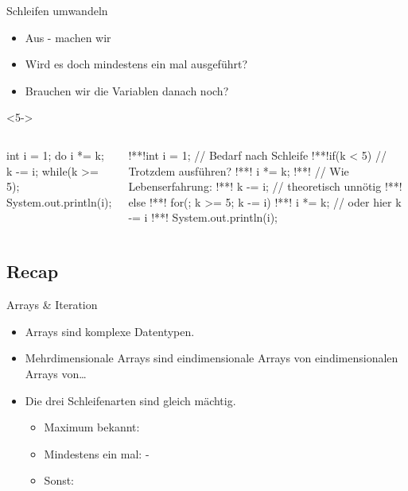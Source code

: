 \begin{frame}[fragile,c]{Schleifen umwandeln}
\begin{itemize}[<+(1)->]
   \itemsep3pt
   \item Aus - machen wir 
   \item Wird es doch mindestens ein mal ausgeführt?
   \item Brauchen wir die Variablen danach noch?
\end{itemize}
\begin{uncoverenv}<5->
\begin{columns}[onlytextwidth,c]
\begin{plainjava}
int i = 1;
do {
  i *= k;
  k -= i;
} while(k >= 5);
System.out.println(i);
\end{plainjava}
\vspace*{-1.15\baselineskip}\par\null\qquad{\color{lightgray}\faCaretRight}
\begin{plainjava}
!**!int i = 1; // Bedarf nach Schleife
!**!if(k < 5) { // Trotzdem ausführen?
!**!   i *= k;
!**!   // Wie Lebenserfahrung:
!**!   k -= i; // theoretisch unnötig
!**!} else {
!**!   for(; k >= 5; k -= i)
!**!      i *= k; // oder hier k -= i
!**!}
System.out.println(i);
\end{plainjava}
\end{columns}
\end{uncoverenv}
\end{frame}
\SidebarReset

\subsection{Recap}
\def\mto{\ensuremath{\to}}
\begin{frame}[c]{\hfill Arrays \& Iteration}
\begin{itemize}[<+(1)->]
   \itemsep18pt
   \item Arrays sind komplexe Datentypen.
   \item Mehrdimensionale Arrays sind eindimensionale Arrays von eindimensionalen Arrays von\ldots
   \item Die drei Schleifenarten sind gleich mächtig. \begin{itemize}
      \item Maximum bekannt: 
      \item Mindestens ein mal: -
      \item Sonst: 
   \end{itemize}
\end{itemize}
\LargeSide
\end{frame}

